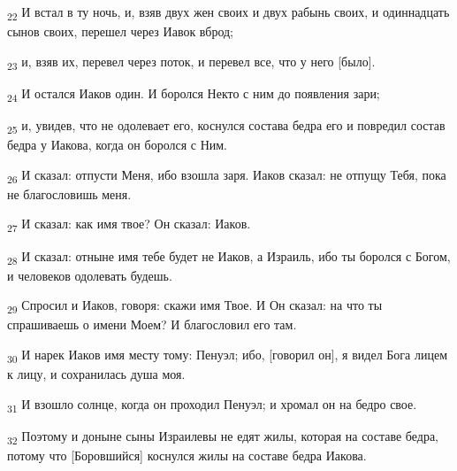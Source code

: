 \begin{tcolorbox}
\textsubscript{22} И встал в ту ночь, и, взяв двух жен своих и двух рабынь своих, и одиннадцать сынов своих, перешел через Иавок вброд;
\end{tcolorbox}
\begin{tcolorbox}
\textsubscript{23} и, взяв их, перевел через поток, и перевел все, что у него [было].
\end{tcolorbox}
\begin{tcolorbox}
\textsubscript{24} И остался Иаков один. И боролся Некто с ним до появления зари;
\end{tcolorbox}
\begin{tcolorbox}
\textsubscript{25} и, увидев, что не одолевает его, коснулся состава бедра его и повредил состав бедра у Иакова, когда он боролся с Ним.
\end{tcolorbox}
\begin{tcolorbox}
\textsubscript{26} И сказал: отпусти Меня, ибо взошла заря. Иаков сказал: не отпущу Тебя, пока не благословишь меня.
\end{tcolorbox}
\begin{tcolorbox}
\textsubscript{27} И сказал: как имя твое? Он сказал: Иаков.
\end{tcolorbox}
\begin{tcolorbox}
\textsubscript{28} И сказал: отныне имя тебе будет не Иаков, а Израиль, ибо ты боролся с Богом, и человеков одолевать будешь.
\end{tcolorbox}
\begin{tcolorbox}
\textsubscript{29} Спросил и Иаков, говоря: скажи имя Твое. И Он сказал: на что ты спрашиваешь о имени Моем? И благословил его там.
\end{tcolorbox}
\begin{tcolorbox}
\textsubscript{30} И нарек Иаков имя месту тому: Пенуэл; ибо, [говорил он], я видел Бога лицем к лицу, и сохранилась душа моя.
\end{tcolorbox}
\begin{tcolorbox}
\textsubscript{31} И взошло солнце, когда он проходил Пенуэл; и хромал он на бедро свое.
\end{tcolorbox}
\begin{tcolorbox}
\textsubscript{32} Поэтому и доныне сыны Израилевы не едят жилы, которая на составе бедра, потому что [Боровшийся] коснулся жилы на составе бедра Иакова.
\end{tcolorbox}

